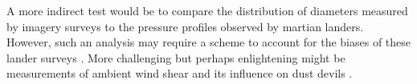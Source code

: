 \documentclass{aastex63}
\begin{document}
A more indirect test would be to compare the distribution of diameters measured by imagery surveys to the pressure profiles observed by martian landers. However, such an analysis may require a scheme to account for the biases of these lander surveys \citep{2018Icar..299..166J, 2019Icar..317..209K}. More challenging but perhaps enlightening might be measurements of ambient wind shear and its influence on dust devils \citep{arya1988}.





\end{document}
